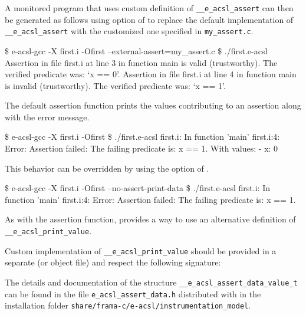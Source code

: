 
A monitored program that uses custom definition of
\texttt{\_\_e\_acsl\_assert} can then be generated
as follows using  option of \eacslgcc to replace the
default implementation of \texttt{\_\_e\_acsl\_assert}
with the customized one specified in \texttt{my\_assert.c}.

\begin{logs}
\$ e-acsl-gcc -X first.i -Ofirst --external-assert=my_assert.c
\$ ./first.e-acsl
Assertion in file first.i at line 3 in function main is valid (trustworthy).
The verified predicate was: `x == 0'.
Assertion in file first.i at line 4 in function main is invalid (trustworthy).
The verified predicate was: `x == 1'.
\end{logs}

The default assertion function prints the values contributing to an assertion
along with the error message.

\begin{logs}
\$ e-acsl-gcc -X first.i -Ofirst
\$ ./first.e-acsl
first.i: In function 'main'
first.i:4: Error: Assertion failed:
        The failing predicate is:
        x == 1.
        With values:
        - x: 0
\end{logs}

This behavior can be overridden by using the 
option of \eacslgcc.

\begin{logs}
  \$ e-acsl-gcc -X first.i -Ofirst --no-assert-print-data
  \$ ./first.e-acsl
  first.i: In function 'main'
  first.i:4: Error: Assertion failed:
          The failing predicate is:
          x == 1.
\end{logs}

As with the assertion function, \eacslgcc provides a way to use an alternative
definition of
\texttt{\_\_e\_acsl\_print\_value}.

Custom implementation of \texttt{\_\_e\_acsl\_print\_value}
 should be provided in a separate \C
(or object file) and respect the following signature:


The details and documentation of the structure
\texttt{\_\_e\_acsl\_assert\_data\_value\_t} can be found in the file
\texttt{e\_acsl\_assert\_data.h} distributed with \eacsl in the installation
folder \texttt{share/frama-c/e-acsl/instrumentation\_model}.

